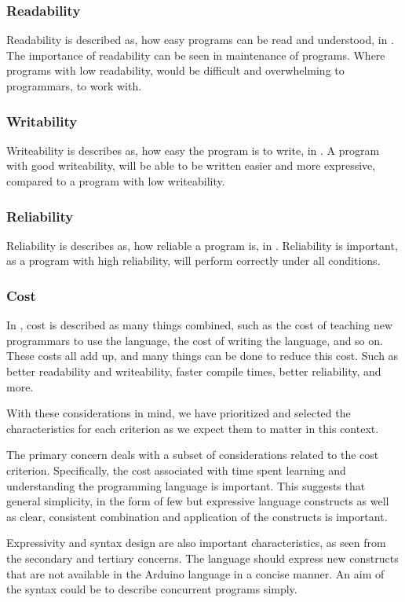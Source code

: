 \subsubsection{Readability}
Readability is described as, how easy programs can be read and understood, in . The importance of readability can be seen in maintenance of programs. Where programs with low readability, would be difficult and overwhelming to programmars, to work with. 
\subsubsection{Writability}
Writeability is describes as, how easy the program is to write, in . A program with good writeability, will be able to be written easier and more expressive, compared to a program with low writeability. 
\subsubsection{Reliability}
Reliability is describes as, how reliable a program is, in . Reliability is important, as a program with high reliability, will perform correctly under all conditions.
\subsubsection{Cost}
In , cost is described as many things combined, such as the cost of teaching new programmars to use the language, the cost of writing the language, and so on. These costs all add up, and many things can be done to reduce this cost. Such as better readability and writeability, faster compile times, better reliability, and more.


With these considerations in mind, we have prioritized and selected the characteristics for each criterion as we expect them to matter in this context.

The primary concern deals with a subset of considerations related to the cost criterion. Specifically, the cost associated with time spent learning and understanding the programming language is important. This suggests that general simplicity, in the form of few but expressive language constructs as well as clear, consistent combination and application of the constructs is important.

Expressivity and syntax design are also important characteristics, as seen from the secondary and tertiary concerns. The language should express new constructs that are not available in the Arduino language in a concise manner. An aim of the syntax could be to describe concurrent programs simply.

